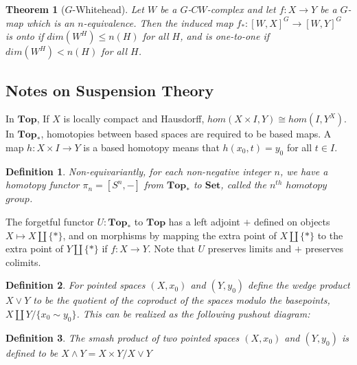 \documentclass{article}
\theoremstyle{problemstyle}
\theoremstyle{problemstyle}
\newtheorem{definition}{Definition}
\theoremstyle{problemstyle}
\theoremstyle{problemstyle}
\theoremstyle{problemstyle}
\theoremstyle{problemstyle}
\newtheorem{theorem}{Theorem}
\begin{document}
\begin{theorem}[$G$-Whitehead]
Let $W$ be a $G$-$CW$-complex and let $f:X \rightarrow Y$ be a $G$-map which is an $n$-equivalence. Then the induced map $f_*:[W,X]^G\rightarrow[W,Y]^G$ is onto if $dim(W^H) \leq n(H)$ for all $H$, and is one-to-one if $dim(W^H) < n(H)$ for all $H$. 
\end{theorem}

\subsection{Notes on Suspension Theory}

In $\textbf{Top}$, If $X$ is locally compact and Hausdorff, $hom(X \times I, Y) \cong hom(I,Y^X)$.\\ 
In $\textbf{Top}_*$, homotopies between based spaces are required to be based maps. A map $h:X \times I \rightarrow Y$ is a based homotopy means that $h(x_0,t) = y_0$ for all $t \in I$. 

\begin{definition}
Non-equivariantly, for each non-negative integer $n$, we have a homotopy functor $\pi_n = [S^n, -]$ from  $\textbf{Top}_*$ to $\textbf{Set}$, called the $n^{th}$ $homotopy$ $group$. 
\end{definition}

The forgetful functor $U:\textbf{Top}_*$ to $\textbf{Top}$ has a left adjoint $+$ defined on objects $X \mapsto X\coprod \{*\}$, and on morphisms by mapping the extra point of $X\coprod \{*\}$ to the extra point of $Y\coprod \{*\}$ if $f:X \rightarrow Y$. Note that $U$ preserves limits and $+$ preserves colimits. 

\begin{definition} For pointed spaces $(X,x_0)$ and $(Y,y_0)$ define the wedge product $X \vee Y$ to be the quotient of the coproduct of the spaces modulo the basepoints, $X \coprod Y / \{x_0 \sim y_0\}$. This can be realized as the following pushout diagram:
\end{definition}

\begin{center}
\end{center}

\begin{definition}
The smash product of two pointed spaces $(X,x_0)$ and $(Y,y_0)$ is defined to be $X \wedge Y = X \times Y / X \vee Y$
\end{definition}
\end{document}

